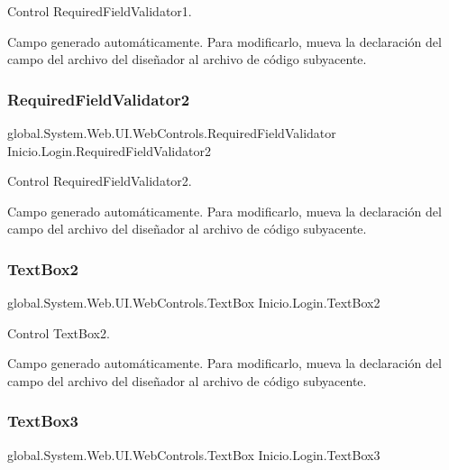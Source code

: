 Control Required\+Field\+Validator1. 

Campo generado automáticamente. Para modificarlo, mueva la declaración del campo del archivo del diseñador al archivo de código subyacente. \mbox{\label{class_inicio_1_1_login_a072466936abf9e49afe63fb3874ddee6}} 
\subsubsection{\texorpdfstring{RequiredFieldValidator2}{RequiredFieldValidator2}}
{\footnotesize\ttfamily global.\+System.\+Web.\+U\+I.\+Web\+Controls.\+Required\+Field\+Validator Inicio.\+Login.\+Required\+Field\+Validator2\hspace{0.3cm}{\ttfamily [protected]}}



Control Required\+Field\+Validator2. 

Campo generado automáticamente. Para modificarlo, mueva la declaración del campo del archivo del diseñador al archivo de código subyacente. \mbox{\label{class_inicio_1_1_login_ac99495a6fbd78cbf118b7c058815e9f2}} 
\subsubsection{\texorpdfstring{TextBox2}{TextBox2}}
{\footnotesize\ttfamily global.\+System.\+Web.\+U\+I.\+Web\+Controls.\+Text\+Box Inicio.\+Login.\+Text\+Box2\hspace{0.3cm}{\ttfamily [protected]}}



Control Text\+Box2. 

Campo generado automáticamente. Para modificarlo, mueva la declaración del campo del archivo del diseñador al archivo de código subyacente. \mbox{\label{class_inicio_1_1_login_af3c872110454773d5d53d83c27e6ccb6}} 
\subsubsection{\texorpdfstring{TextBox3}{TextBox3}}
{\footnotesize\ttfamily global.\+System.\+Web.\+U\+I.\+Web\+Controls.\+Text\+Box Inicio.\+Login.\+Text\+Box3\hspace{0.3cm}{\ttfamily [protected]}}



